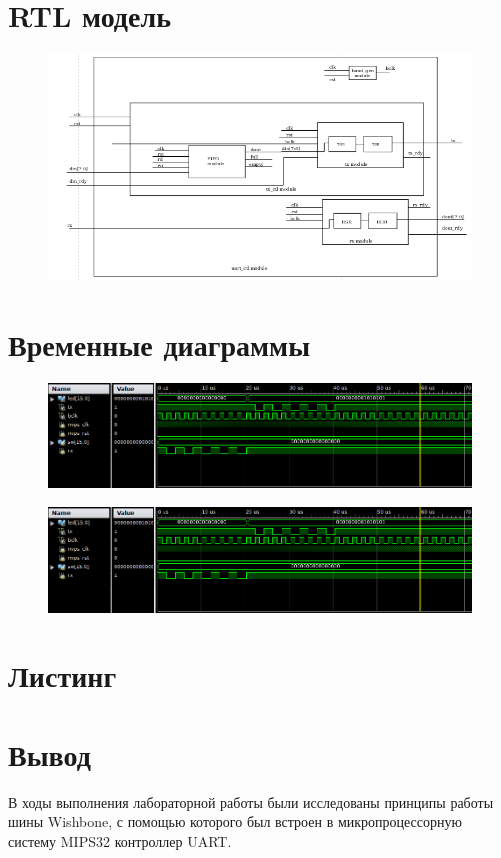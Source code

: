\documentclass[a4paper, 10pt]{article}
\begin{document}
     \section*{RTL модель}
        \begin{landscape}
            \begin{figure}[ht]
                \includegraphics{../images/rtl_uart.png}
            \end{figure}
        \end{landscape}
     \section*{Временные диаграммы}
        \begin{figure}[h!]
            \includegraphics[scale=0.5]{../images/echo_mode.png}
        \end{figure}
        \begin{figure}[h!]
            \includegraphics[scale=0.5]{../images/echo_mode.png}
        \end{figure}

     \section*{Листинг}
        
        
        
        
        
        

    \section*{Вывод}
        В ходы выполнения лабораторной работы были исследованы принципы работы
        шины Wishbone, с помощью которого был встроен в микропроцессорную 
        систему MIPS32 контроллер UART.
\end{document}
